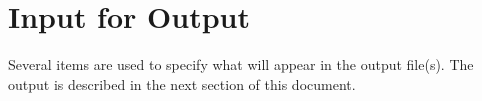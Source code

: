 \chapter{Input for Output}\label{input-for-output}

Several items are used to specify what will appear in the output file(s). The output is described in the next section of this document.
